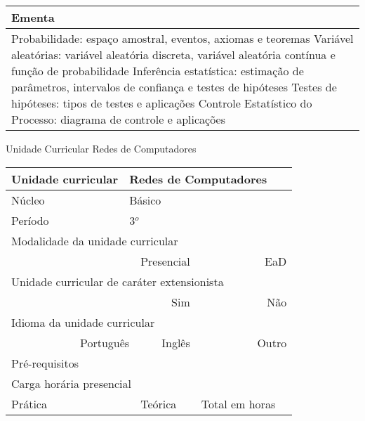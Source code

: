 \begin{quadro}[ht!]
\begin{tabular}{|p{3cm} p{2cm} p{3cm} p{2cm} p{3cm} p{2cm}|}
\multicolumn{6}{|p{15cm}|}{\cellcolor{blue1} Ementa} \\\hline
\hline\multicolumn{6}{|p{15cm}|}{\scriptsize Probabilidade: espaço amostral, eventos, axiomas e teoremas Variável aleatórias: variável aleatória discreta, variável aleatória contínua e função de probabilidade Inferência estatística: estimação de parâmetros, intervalos de confiança e testes de hipóteses Testes de hipóteses: tipos de testes e aplicações Controle Estatístico do Processo: diagrama de controle e aplicações}\\\hline 
\hline
	\end{tabular}
\end{quadro}


\begin{quadro}[ht!]
  \centering\scriptsize
\caption{Unidade Curricular Redes de Computadores}
\label{unit_16}
\begin{tabular}{|p{3cm} p{2cm} p{3cm} p{2cm} p{3cm} p{2cm}|}\hline
\multicolumn{1}{|p{3cm}|}{\cellcolor{blue1} Unidade curricular} & \multicolumn{5}{p{9cm}|}{Redes de Computadores}\\\hline
\multicolumn{1}{|p{3cm}|}{\cellcolor{blue1} Núcleo} & \multicolumn{5}{p{11.5cm}|}{Básico}\\\hline
\multicolumn{1}{|p{3cm}|}{\cellcolor{blue1} Período} & \multicolumn{5}{p{9cm}|}{3$^o$}\\\hline
\multicolumn{6}{|p{15cm}|}{\cellcolor{blue1} Modalidade da unidade curricular} \\\hline
\multicolumn{2}{|r}{		} &  \multicolumn{2}{r}{Presencial \XBox} & \multicolumn{2}{r|}{EaD \Square	} \\\hline
\multicolumn{6}{|p{15cm}|}{\cellcolor{blue1} Unidade curricular de caráter extensionista} \\\hline
\multicolumn{4}{|r}{			Sim \Square	} & \multicolumn{2}{r|}{	Não \XBox	}\\\hline
\multicolumn{6}{|p{15cm}|}{\cellcolor{blue1} Idioma da unidade curricular} \\ \hline
\multicolumn{2}{|r}{	Português \XBox	} &  \multicolumn{2}{r}{	Inglês \Square	} & \multicolumn{2}{r|}{	Outro \Square	} \\ \hline
\multicolumn{1}{|p{3cm}|}{\cellcolor{blue1} Pré-requisitos} & \multicolumn{5}{p{9cm}|}{}\\ \hline
\multicolumn{6}{|p{15cm}|}{\cellcolor{blue1} Carga horária presencial} \\ \hline
\multicolumn{1}{|p{3cm}|}{\raggedleft Prática} & \multicolumn{1}{p{1cm}|}{\centering	30	} &  \multicolumn{1}{p{3cm}|}{\raggedleft Teórica}  & \multicolumn{1}{p{1cm}|}{\centering 	30	} & \multicolumn{1}{p{3cm}|}{\raggedleft Total em horas} & \multicolumn{1}{p{1cm}|}{\raggedleft	60	} \\ \hline 

\end{tabular}
\end{quadro}

